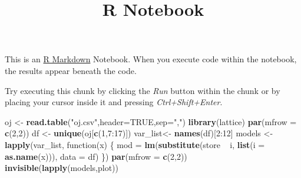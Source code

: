 \documentclass[]{article}
\title{R Notebook}
\author{}
\date{}
\newenvironment{Shaded}{\begin{snugshade}}{\end{snugshade}}
\newcommand{\KeywordTok}[1]{\textcolor[rgb]{0.13,0.29,0.53}{\textbf{{#1}}}}
\newcommand{\DataTypeTok}[1]{\textcolor[rgb]{0.13,0.29,0.53}{{#1}}}
\newcommand{\DecValTok}[1]{\textcolor[rgb]{0.00,0.00,0.81}{{#1}}}
\newcommand{\StringTok}[1]{\textcolor[rgb]{0.31,0.60,0.02}{{#1}}}
\newcommand{\OtherTok}[1]{\textcolor[rgb]{0.56,0.35,0.01}{{#1}}}
\newcommand{\NormalTok}[1]{{#1}}
\begin{document}
\maketitle

This is an \href{http://rmarkdown.rstudio.com}{R Markdown} Notebook.
When you execute code within the notebook, the results appear beneath
the code.

Try executing this chunk by clicking the \emph{Run} button within the
chunk or by placing your cursor inside it and pressing
\emph{Ctrl+Shift+Enter}.

\begin{Shaded}
\begin{Highlighting}[]
\NormalTok{oj <-}\StringTok{ }\KeywordTok{read.table}\NormalTok{(}\StringTok{"oj.csv"}\NormalTok{,}\DataTypeTok{header=}\OtherTok{TRUE}\NormalTok{,}\DataTypeTok{sep=}\StringTok{","}\NormalTok{)}
\KeywordTok{library}\NormalTok{(lattice)}
\KeywordTok{par}\NormalTok{(}\DataTypeTok{mfrow =} \KeywordTok{c}\NormalTok{(}\DecValTok{2}\NormalTok{,}\DecValTok{2}\NormalTok{))}
\NormalTok{df <-}\StringTok{ }\KeywordTok{unique}\NormalTok{(oj[}\KeywordTok{c}\NormalTok{(}\DecValTok{1}\NormalTok{,}\DecValTok{7}\NormalTok{:}\DecValTok{17}\NormalTok{)]) }
\NormalTok{var_list<-}\StringTok{ }\KeywordTok{names}\NormalTok{(df)[}\DecValTok{2}\NormalTok{:}\DecValTok{12}\NormalTok{]}
\NormalTok{models <-}\StringTok{ }\KeywordTok{lapply}\NormalTok{(var_list, }
          \NormalTok{function(x) }
            \NormalTok{\{}
             \NormalTok{mod =}\StringTok{ }\KeywordTok{lm}\NormalTok{(}\KeywordTok{substitute}\NormalTok{(store ~}\StringTok{ }\NormalTok{i, }\KeywordTok{list}\NormalTok{(}\DataTypeTok{i =} \KeywordTok{as.name}\NormalTok{(x))), }\DataTypeTok{data =} \NormalTok{df)}
            \NormalTok{\})}
\KeywordTok{par}\NormalTok{(}\DataTypeTok{mfrow =} \KeywordTok{c}\NormalTok{(}\DecValTok{2}\NormalTok{,}\DecValTok{2}\NormalTok{))}
\KeywordTok{invisible}\NormalTok{(}\KeywordTok{lapply}\NormalTok{(models,plot))}
\end{Highlighting}
\end{Shaded}
\end{document}
